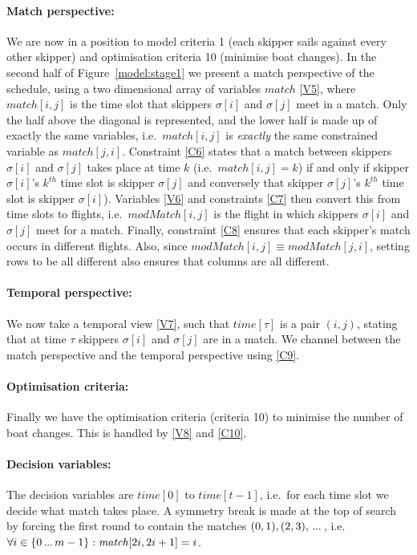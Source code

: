 \documentclass{llncs}
\newcommand{\match}{\mathit{match}}
\newcommand{\modMatch}{\mathit{modMatch}}
\newcommand{\timeVar}{\mathit{time}}
\newcommand\nldots{\,\hbox to 0.8em{.\hss.\hss.}\,}
\begin{document}
\paragraph{Match perspective:} We are now in a position to model criteria 1
(each skipper sails against every other skipper) and optimisation criteria 10
(minimise boat changes).  In the second half of Figure~\ref{model:stage1} we
present a match perspective of the schedule, using a two dimensional array of
variables $\match$ \eqref{V5}, where $\match[{i,j}]$ is the time slot that
skippers $\sigma[{i}]$ and $\sigma[{j}]$ meet in a match. Only the half above
the diagonal is represented, and the lower half is made up of exactly the same
variables, i.e.\ $\match[{i,j}]$ is \emph{exactly} the same constrained
variable as $\match[{j,i}]$. Constraint \eqref{C6} states that  a match between
skippers $\sigma[{i}]$ and $\sigma[{j}]$ takes place at time $k$ (i.e.\
$\match[{i,j}] = k$) if and only if  skipper $\sigma[{i}]$'s $k^{th}$ time slot
is skipper $\sigma[{j}]$ and conversely that skipper $\sigma[{j}]$'s $k^{th}$
time slot is skipper $\sigma[{i}]$). Variables \eqref{V6} and constraints
\eqref{C7} then convert this from time slots to flights, i.e.\
$\modMatch[{i,j}]$ is the flight in which skippers $\sigma[{i}]$ and
$\sigma[{j}]$ meet for a match. Finally, constraint \eqref{C8} ensures that
each skipper's match occurs in different flights. Also, since $\modMatch[{i,j}]
\equiv \modMatch[{j,i}]$, setting rows to be all different also ensures that
columns are all different.

\paragraph{Temporal perspective:} We now take a temporal view \eqref{V7}, such
that $\timeVar[{\tau}]$ is a pair $(i,j)$, stating that at time $\tau$ skippers
$\sigma[{i}]$ and $\sigma[{j}]$ are in a match. We channel between the match
perspective and the temporal perspective using \eqref{C9}.

\paragraph{Optimisation criteria:} Finally we have the optimisation criteria
(criteria 10) to minimise the number of boat changes. This is handled by
\eqref{V8} and \eqref{C10}.

\paragraph{Decision variables:} The decision variables are $\timeVar[{0}]$ to
$\timeVar[{t-1}]$, i.e.\ for each time slot we decide what match takes place. A
symmetry break is made at the top of search by forcing the first round to
contain the matches $(0,1), (2,3), \nldots$, i.e.\ $\forall i \in \{0 \nldots
{m-1}\} : \match[{2i, 2i+1}] = i$.
\end{document}
